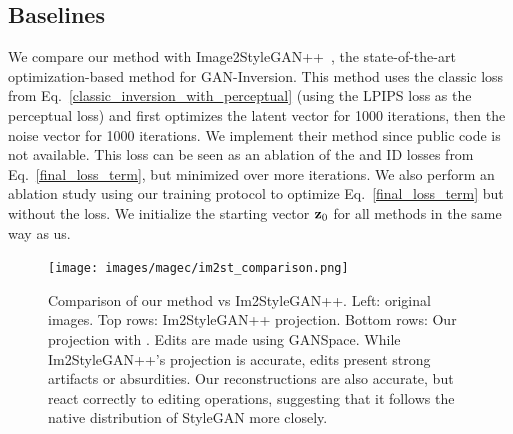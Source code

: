 \subsection{Baselines}
We compare our method with Image2StyleGAN++~\citep{abdal2020}, the state-of-the-art
 optimization-based method for GAN-Inversion. This method uses the classic loss from
  Eq.~\ref{classic_inversion_with_perceptual} (using the \ac{LPIPS} \citep{zhanglpips2018} loss 
  as the perceptual loss) and first optimizes the latent vector for 1000 iterations, then
   the noise vector for 1000 iterations. We implement their method since public code is not available. 
   This loss can be seen as an ablation of the \magec 
   and ID losses from Eq.~\ref{final_loss_term}, but minimized over more iterations. We
    also perform an ablation study using our training protocol to optimize 
    Eq.~\ref{final_loss_term} but without the \magec loss. We initialize the starting 
    vector $\mathbf{z}_0$ for all methods 
    in the same way as us.


\begin{figure}
  \centering
    \texttt{[image: images/magec/im2st\_comparison.png]}
    \caption{Comparison of our method vs Im2StyleGAN++. Left: original images. Top rows: 
    Im2StyleGAN++ projection. Bottom rows: Our projection with \magec. Edits are made 
    using GANSpace. While Im2StyleGAN++'s projection is accurate, edits present strong 
    artifacts or absurdities. Our reconstructions are also accurate, but react correctly 
    to editing operations, suggesting that it follows the native distribution of StyleGAN
     more closely.}
    \label{fig:im2stcomparison}
\end{figure}



